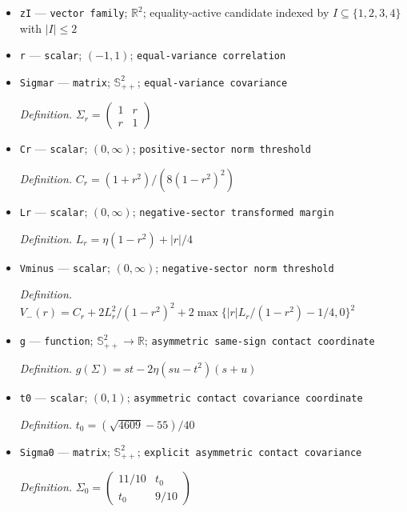 \documentclass{article}
\begin{document}
\begin{itemize}
  \par\smallskip\noindent\emph{Definition.} \(z_0=-G^{-1}h\)
  \item \texttt{zI} --- \texttt{vector family}; \(\mathbb R^2\); equality-active candidate indexed by \(I\subseteq\{1,2,3,4\}\) with \(|I|\le2\)
  \item \texttt{r} --- \texttt{scalar}; \((-1,1)\); \texttt{equal-\allowbreak{}variance correlation}
  \item \texttt{Sigmar} --- \texttt{matrix}; \(\mathbb S_{++}^{2}\); \texttt{equal-\allowbreak{}variance covariance}
  \par\smallskip\noindent\emph{Definition.} \(\Sigma_r=\begin{pmatrix}1&r\\r&1\end{pmatrix}\)
  \item \texttt{Cr} --- \texttt{scalar}; \((0,\infty)\); \texttt{positive-\allowbreak{}sector norm threshold}
  \par\smallskip\noindent\emph{Definition.} \(C_r=(1+r^2)/(8(1-r^2)^2)\)
  \item \texttt{Lr} --- \texttt{scalar}; \((0,\infty)\); \texttt{negative-\allowbreak{}sector transformed margin}
  \par\smallskip\noindent\emph{Definition.} \(L_r=\eta(1-r^2)+|r|/4\)
  \item \texttt{Vminus} --- \texttt{scalar}; \((0,\infty)\); \texttt{negative-\allowbreak{}sector norm threshold}
  \par\smallskip\noindent\emph{Definition.} \(V_-(r)=C_r+2L_r^2/(1-r^2)^2+2\max\{|r|L_r/(1-r^2)-1/4,0\}^2\)
  \item \texttt{g} --- \texttt{function}; \(\mathbb S_{++}^{2}\to\mathbb R\); \texttt{asymmetric same-\allowbreak{}sign contact coordinate}
  \par\smallskip\noindent\emph{Definition.} \(g(\Sigma)=st-2\eta(su-t^2)(s+u)\)
  \item \texttt{t0} --- \texttt{scalar}; \((0,1)\); \texttt{asymmetric contact covariance coordinate}
  \par\smallskip\noindent\emph{Definition.} \(t_0=(\sqrt{4609}-55)/40\)
  \item \texttt{Sigma0} --- \texttt{matrix}; \(\mathbb S_{++}^{2}\); \texttt{explicit asymmetric contact covariance}
  \par\smallskip\noindent\emph{Definition.} \(\Sigma_0=\begin{pmatrix}11/10&t_0\\t_0&9/10\end{pmatrix}\)

\end{itemize}
\end{document}
